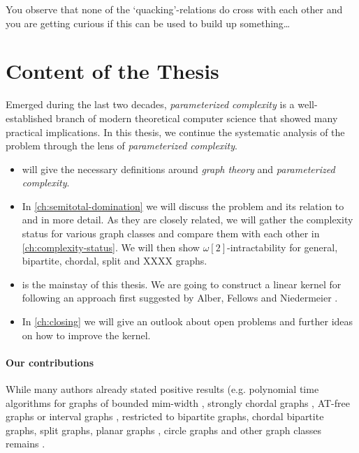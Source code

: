 You observe that none of the `quacking'-relations do cross with each other and you are getting curious if this can be used to build up something\ldots

\section{Content of the Thesis}

Emerged during the last two decades, \textit{parameterized complexity} is a well-established branch of modern theoretical computer science that showed many practical implications. 
In this thesis, we continue the systematic analysis of the \sdom problem through the lens of \textit{parameterized complexity}. 

\begin{itemize}
    \item {} will give the necessary definitions around \textit{graph theory} and \textit{parameterized complexity}.
    \item In \cref{ch:semitotal-domination} we will discuss the \sdom problem and its relation to \dom and \tdom in more detail. As they are closely related, we will gather the complexity status for various graph classes and compare them with each other in \cref{ch:complexity-status}. We will then show $\omega[2]$-intractability for general, bipartite, chordal, split and XXXX graphs.
    \item {} is the mainstay of this thesis. We are going to construct a linear kernel for \psdom following an approach first suggested by Alber, Fellows and Niedermeier \cite{Alber2004}. 
    \item In \cref{ch:closing} we will give an outlook about open problems and further ideas on how to improve the kernel.

\end{itemize}

\paragraph{Our contributions}

While many authors already stated positive results (e.g. polynomial time algorithms for graphs of bounded mim-width \cite{Galby2020}, strongly chordal graphs \cite{Tripathi2021}, AT-free graphs \cite{Kloks2021} or interval graphs \cite{Henning2019}, \sdom restricted to bipartite graphs, chordal bipartite graphs, split graphs, planar graphs \cite{Henning2019}, circle graphs \cite{Kloks2021} and other graph classes remains \NPc.


